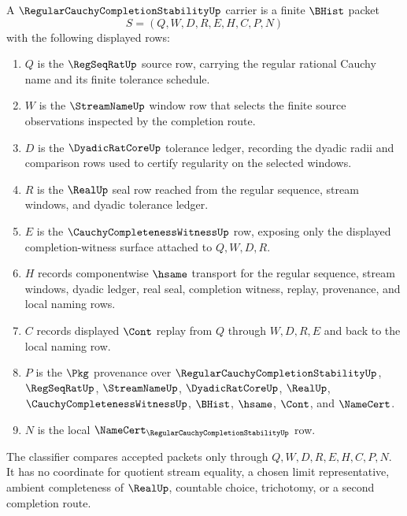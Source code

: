 \begin{definition}
\label{def:regular-cauchy-completion-stability-carrier}
A $\RegularCauchyCompletionStabilityUp$ carrier is a finite $\BHist$ packet
$$
S=(Q,W,D,R,E,H,C,P,N)
$$
with the following displayed rows:
\begin{enumerate}
\item $Q$ is the $\RegSeqRatUp$ source row, carrying the regular rational Cauchy name and its finite tolerance schedule.
\item $W$ is the $\StreamNameUp$ window row that selects the finite source observations inspected by the completion route.
\item $D$ is the $\DyadicRatCoreUp$ tolerance ledger, recording the dyadic radii and comparison rows used to certify regularity on the selected windows.
\item $R$ is the $\RealUp$ seal row reached from the regular sequence, stream windows, and dyadic tolerance ledger.
\item $E$ is the $\CauchyCompletenessWitnessUp$ row, exposing only the displayed completion-witness surface attached to $Q,W,D,R$.
\item $H$ records componentwise $\hsame$ transport for the regular sequence, stream windows, dyadic ledger, real seal, completion witness, replay, provenance, and local naming rows.
\item $C$ records displayed $\Cont$ replay from $Q$ through $W,D,R,E$ and back to the local naming row.
\item $P$ is the $\Pkg$ provenance over $\RegularCauchyCompletionStabilityUp$, $\RegSeqRatUp$, $\StreamNameUp$, $\DyadicRatCoreUp$, $\RealUp$, $\CauchyCompletenessWitnessUp$, $\BHist$, $\hsame$, $\Cont$, and $\NameCert$.
\item $N$ is the local $\NameCert_{\RegularCauchyCompletionStabilityUp}$ row.
\end{enumerate}
The classifier compares accepted packets only through $Q,W,D,R,E,H,C,P,N$. It has no coordinate for quotient stream equality, a chosen limit representative, ambient completeness of $\RealUp$, countable choice, trichotomy, or a second completion route.
\end{definition}

